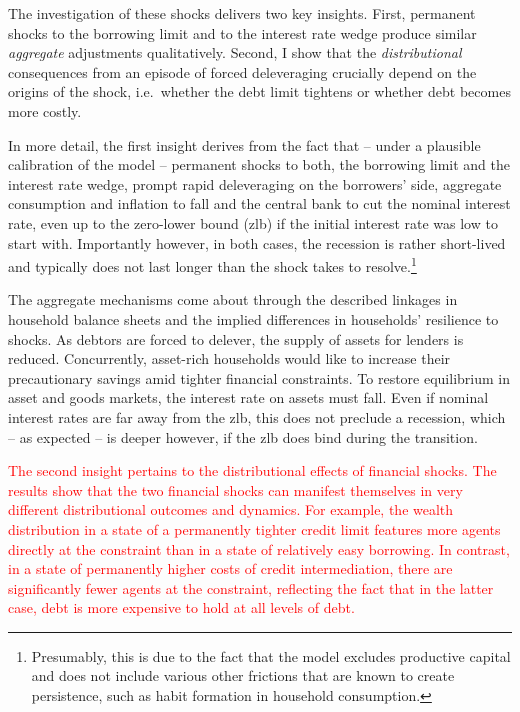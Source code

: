 \documentclass[12pt]{article} %
\numberwithin{equation}{section} %
\numberwithin{figure}{section}
\numberwithin{table}{section}
\begin{document}
The investigation of these shocks delivers two key insights. First, permanent shocks to the borrowing limit and to the interest rate wedge produce similar \textit{aggregate} adjustments qualitatively. Second, I show that the \textit{distributional} consequences from an episode of forced deleveraging crucially depend on the origins of the shock, i.e.~whether the debt limit tightens or whether debt becomes more costly.

In more detail, the first insight derives from the fact that -- under a plausible calibration of the model -- permanent shocks to both, the borrowing limit and the interest rate wedge, prompt rapid deleveraging on the borrowers' side, aggregate consumption and inflation to fall and the central bank to cut the nominal interest rate, even up to the zero-lower bound (\Gls{zlb}) if the initial interest rate was low to start with. Importantly however, in both cases, the recession is rather short-lived and typically does not last longer than the shock takes to resolve.\footnote{Presumably, this is due to the fact that the model excludes productive capital and does not include various other frictions that are known to create persistence, such as habit formation in household consumption.} 

The aggregate mechanisms come about through the described linkages in household balance sheets and the implied differences in households' resilience to shocks. As debtors are forced to delever, the supply of assets for lenders is reduced. Concurrently, asset-rich households would like to increase their precautionary savings amid tighter financial constraints. To restore equilibrium in asset and goods markets, the interest rate on assets must fall. Even if nominal interest rates are far away from the \Gls{zlb}, this does not preclude a recession, which -- as expected -- is deeper however, if the \Gls{zlb} does bind during the transition. 

\textcolor{red}{The second insight pertains to the distributional effects of financial shocks. The results show that the two financial shocks can manifest themselves in very different distributional outcomes and dynamics. For example, the wealth distribution in a state of a permanently tighter credit limit features more agents directly at the constraint than in a state of relatively easy borrowing. In contrast, in a state of permanently higher costs of credit intermediation, there are significantly fewer agents at the constraint, reflecting the fact that in the latter case, debt is more expensive to hold at all levels of debt.}
\end{document}
